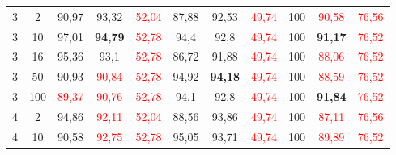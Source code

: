 \begin{table}[ht]
\begin{tabular}{cc|ccc|ccc|ccc}
        {3}                           & {2}     & {90,97}                             & {93,32}                             & \textcolor{red}{52,04}                   & {87,88}                         & {92,53}                         & \textcolor{red}{49,74}         & {100}                           & \textcolor{red}{90,58}          & \textcolor{red}{76,56}         \\
        {3}                           & {10}    & {97,01}                             & \textbf{{94,79}}                    & \textcolor{red}{52,78}                   & {94,4}                          & {92,8}                          & \textcolor{red}{49,74}         & {100}                           & \textbf{91,17}                  & \textcolor{red}{76,52}         \\
        {3}                           & {16}    & {95,36}                             & {93,1}                              & \textcolor{red}{52,78}                   & {86,72}                         & {91,88}                         & \textcolor{red}{49,74}         & {100}                           & \textcolor{red}{88,06}          & \textcolor{red}{76,52}         \\
        {3}                           & {50}    & {90,93}                             & \textcolor{red}{90,84}              & \textcolor{red}{52,78}                   & {94,92}                         & \textbf{94,18}                  & \textcolor{red}{49,74}         & {100}                           & \textcolor{red}{88,59}          & \textcolor{red}{76,52}         \\
        {3}                           & {100}   & \textcolor{red}{89,37}              & \textcolor{red}{90,76}              & \textcolor{red}{52,78}                   & {94,1}                          & {92,8}                          & \textcolor{red}{49,74}         & {100}                           & \textbf{91,84}                  & \textcolor{red}{76,52}         \\
        {4}                           & {2}     & {94,86}                             & \textcolor{red}{92,11}              & \textcolor{red}{52,04}                   & {88,56}                         & {93,86}                         & \textcolor{red}{49,74}         & {100}                           & \textcolor{red}{87,11}          & \textcolor{red}{76,56}         \\
        {4}                           & {10}    & {90,58}                             & \textcolor{red}{92,75}              & \textcolor{red}{52,78}                   & {95,05}                         & {93,71}                         & \textcolor{red}{49,74}         & {100}                           & \textcolor{red}{89,89}          & \textcolor{red}{76,52}         \\

\end{tabular}
\end{table}
